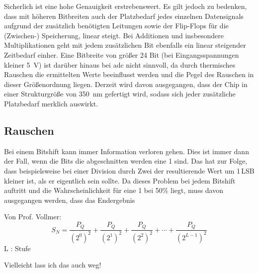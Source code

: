 Sicherlich ist eine hohe Genauigkeit erstrebenswert. Es gilt jedoch zu bedenken, dass mit höheren Bitbreiten auch der Platzbedarf jedes einzelnen Datensignals aufgrund der 
zusätzlich benötigten Leitungen sowie der Flip-Flops für die (Zwischen-) Speicherung, linear steigt. 
Bei Additionen und insbesondere Multiplikationen geht mit jedem zusätzlichen Bit ebenfalls ein linear steigender Zeitbedarf einher.
Eine Bitbreite von größer 24 Bit (bei Eingangsspannungen kleiner \SI{5}{V}) ist darüber hinaus bei \gls{adc} nicht sinnvoll, da durch thermisches Rauschen die ermittelten 
Werte beeinflusst werden und die Pegel des Rauschen in dieser Größenordnung liegen.
Derzeit wird davon ausgegangen, dass der Chip in einer Strukturgröße von \SI{350}{nm} gefertigt wird, sodass sich jeder zusätzliche Platzbedarf merklich auswirkt.


 
\subsection{Rauschen}
Bei einem Bitshift kann immer Information verloren gehen. Dies ist immer dann der Fall, wenn die Bits die abgeschnitten werden eine 1 sind. Das hat zur Folge, dass beispielsweise
bei einer Division durch Zwei der resultierende Wert um 1\,LSB kleiner ist, als er eigentlich sein sollte. 
Da dieses Problem bei jedem Bitshift auftritt und die Wahrscheinlichkeit für eine 1 bei 50$\%$ liegt, muss davon ausgegangen werden, dass das Endergebnis 


Von Prof. Vollmer: 
\begin{equation}
 S_N = \frac{P_Q}{\left(2^0\right)^2} + \frac{P_Q}{\left(2^1\right)^2} + \frac{P_Q}{\left(2^2\right)^2} + \cdots + \frac{P_Q}{\left(2^{L-1}\right)^2}
\end{equation}
L : Stufe 

Vielleicht lass ich das auch weg!
